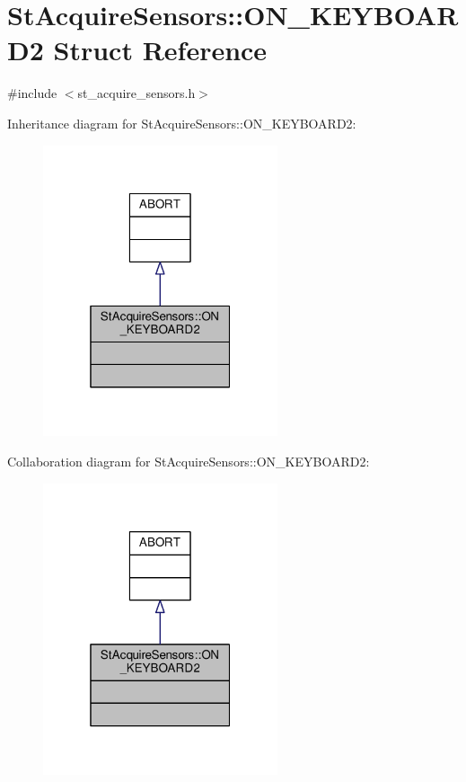 \hypertarget{structStAcquireSensors_1_1ON__KEYBOARD2}{}\section{St\+Acquire\+Sensors\+:\+:O\+N\+\_\+\+K\+E\+Y\+B\+O\+A\+R\+D2 Struct Reference}
\label{structStAcquireSensors_1_1ON__KEYBOARD2}


{\ttfamily \#include $<$st\+\_\+acquire\+\_\+sensors.\+h$>$}



Inheritance diagram for St\+Acquire\+Sensors\+:\+:O\+N\+\_\+\+K\+E\+Y\+B\+O\+A\+R\+D2\+:
\nopagebreak
\begin{figure}[H]
\begin{center}
\leavevmode
\includegraphics[width=196pt]{structStAcquireSensors_1_1ON__KEYBOARD2__inherit__graph}
\end{center}
\end{figure}


Collaboration diagram for St\+Acquire\+Sensors\+:\+:O\+N\+\_\+\+K\+E\+Y\+B\+O\+A\+R\+D2\+:
\nopagebreak
\begin{figure}[H]
\begin{center}
\leavevmode
\includegraphics[width=196pt]{structStAcquireSensors_1_1ON__KEYBOARD2__coll__graph}
\end{center}
\end{figure}


